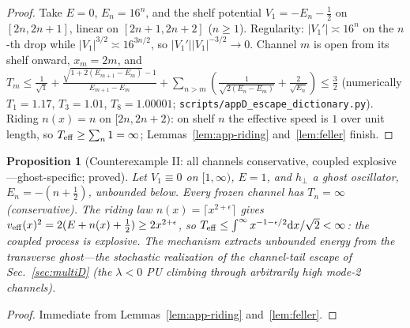 \documentclass[11pt]{article}
\newtheorem{proposition}[theorem]{Proposition}
\theoremstyle{definition}
\theoremstyle{remark}
\newcommand{\dd}{\mathrm{d}}
\begin{document}
\begin{proof}
Take $E=0$, $E_{n}=16^{n}$, and the shelf potential
$V_{1}=-E_{n}-\tfrac12$ on $[2n,2n+1]$, linear on $[2n+1,2n+2]$
($n\ge1$). Regularity: $|V_{1}'|\asymp16^{n}$ on the $n$-th drop while
$|V_{1}|^{3/2}\asymp16^{3n/2}$, so $|V_{1}'||V_{1}|^{-3/2}\to0$. Channel
$m$ is open from its shelf onward, $x_{m}=2m$, and
$T_{m}\le\tfrac1{\sqrt1}+\tfrac{\sqrt{1+2(E_{m+1}-E_{m})}-1}{E_{m+1}-E_{m}}+\sum_{n>m}
(\tfrac1{\sqrt{2(E_{n}-E_{m})}}+\tfrac2{\sqrt{E_{n}}})\le\tfrac32$
(numerically $T_{1}=1.17$, $T_{3}=1.01$, $T_{8}=1.00001$;
\texttt{scripts/appD\_escape\_dictionary.py}). Riding
$n(x)=n$ on $[2n,2n+2)$: on shelf $n$ the effective speed is $1$ over
unit length, so $T_{\rm eff}\ge\sum_{n}1=\infty$;
Lemmas~\ref{lem:app-riding} and~\ref{lem:feller} finish.
\end{proof}

\begin{proposition}[Counterexample II: all channels conservative,
coupled explosive---ghost-specific; proved]\label{prop:app-ce2}
Let $V_{1}\equiv0$ on $[1,\infty)$, $E=1$, and $h_{\perp}$ a
\emph{ghost} oscillator, $E_{n}=-(n+\tfrac12)$, unbounded below. Every
frozen channel has $T_{n}=\infty$ (conservative). The riding law
$n(x)=\lceil x^{2+\epsilon}\rceil$ gives
$v_{\rm eff}(x)^{2}=2(E+n(x)+\tfrac12)\ge2x^{2+\epsilon}$, so
$T_{\rm eff}\le\int^{\infty}x^{-1-\epsilon/2}\dd x/\sqrt2<\infty$: the
coupled process is \emph{explosive}. The mechanism extracts unbounded
energy from the transverse ghost---the stochastic realization of the
channel-tail escape of Sec.~\ref{sec:multiD} (the $\lambda<0$ PU
climbing through arbitrarily high mode-2 channels).
\end{proposition}

\begin{proof}
Immediate from Lemmas~\ref{lem:app-riding} and~\ref{lem:feller}.
\end{proof}
\end{document}
